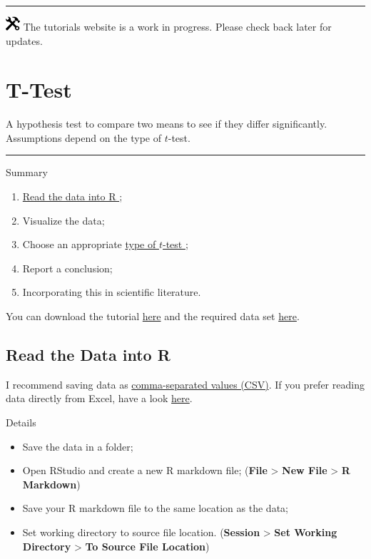 \documentclass[
]{book}
\providecommand{\tightlist}{%
  \setlength{\itemsep}{0pt}\setlength{\parskip}{0pt}}
\begin{document}
\begin{center}\rule{0.5\linewidth}{0.5pt}\end{center}

\includegraphics[width=0.20833in,height=0.20833in]{figures/underconstruction.png} The tutorials website is a work in progress. Please check back later for updates.

\hypertarget{t-test}{%
\chapter{T-Test}\label{t-test}}

A hypothesis test to compare two means to see if they differ significantly. Assumptions depend on the type of \(t\)-test.

\begin{center}\rule{0.5\linewidth}{0.5pt}\end{center}

Summary

\begin{enumerate}
\def\labelenumi{\arabic{enumi}.}
\tightlist
\item
  \href{https://youtu.be/BGUqZc-Pb8w}{Read the data into R };
\item
  Visualize the data;
\item
  Choose an appropriate \href{https://youtu.be/qJA3CvFt_pc}{type of \(t\)-test };
\item
  Report a conclusion;
\item
  Incorporating this in scientific literature.
\end{enumerate}

You can download the tutorial \href{files/tutorial_t-test.Rmd}{here} and the required data set \href{data/two-groups.csv}{here}.

\hypertarget{read-t}{%
\section{Read the Data into R}\label{read-t}}

I recommend saving data as \href{https://youtu.be/BGUqZc-Pb8w}{comma-separated values (CSV)}. If you prefer reading data directly from Excel, have a look \protect\hyperlink{Excel}{here}.

Details

\begin{itemize}
\tightlist
\item
  Save the data in a folder;
\item
  Open RStudio and create a new R markdown file; (\textbf{File} \textgreater{} \textbf{New File} \textgreater{} \textbf{R Markdown})
\item
  Save your R markdown file to the same location as the data;
\item
  Set working directory to source file location. (\textbf{Session} \textgreater{} \textbf{Set Working Directory} \textgreater{} \textbf{To Source File Location})
\end{itemize}
\end{document}
